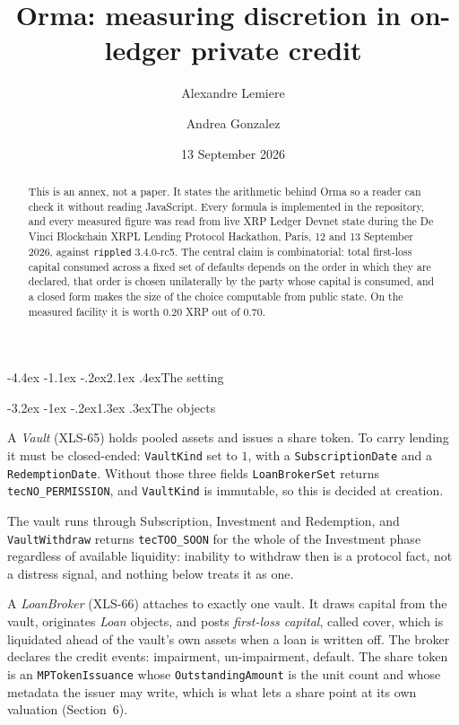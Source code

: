 \documentclass[11pt]{article}
\title{Orma: measuring discretion in on-ledger private credit}
\author{Alexandre Lemiere \and Andrea Gonzalez}
\date{13 September 2026}
\makeatletter
\renewcommand\section{\@startsection{section}{1}{\z@}%
  {-4.4ex \@plus -1.1ex \@minus -.2ex}{2.1ex \@plus .4ex}{\normalfont\Large\bfseries}}
\renewcommand\subsection{\@startsection{subsection}{2}{\z@}%
  {-3.2ex \@plus -1ex \@minus -.2ex}{1.3ex \@plus .3ex}{\normalfont\large\bfseries}}
\theoremstyle{orma}
\theoremstyle{ormaupright}
\makeatother
\begin{document}
\maketitle

\begin{abstract}
\noindent
This is an annex, not a paper. It states the arithmetic behind Orma so a reader can check it
without reading JavaScript. Every formula is implemented in the repository, and every
measured figure was read from live XRP Ledger Devnet state during the De Vinci Blockchain
XRPL Lending Protocol Hackathon, Paris, 12 and 13 September 2026, against \texttt{rippled}
3.4.0-rc5. The central claim is combinatorial: total first-loss capital consumed across a
fixed set of defaults depends on the order in which they are declared, that order is chosen
unilaterally by the party whose capital is consumed, and a closed form makes the size of the
choice computable from public state. On the measured facility it is worth $0.20$ XRP out of
$0.70$.
\end{abstract}

\section{The setting}

\subsection{The objects}

A \emph{Vault} (XLS-65) holds pooled assets and issues a share token. To carry lending it
must be closed-ended: \texttt{VaultKind} set to $1$, with a \texttt{SubscriptionDate} and a
\texttt{RedemptionDate}. Without those three fields \texttt{LoanBrokerSet} returns
\texttt{tecNO\_PERMISSION}, and \texttt{VaultKind} is immutable, so this is decided at
creation.

The vault runs through Subscription, Investment and Redemption, and
\texttt{VaultWithdraw} returns \texttt{tecTOO\_SOON} for the whole of the Investment phase
regardless of available liquidity: inability to withdraw then is a protocol fact, not a
distress signal, and nothing below treats it as one.

A \emph{LoanBroker} (XLS-66) attaches to exactly one vault. It draws capital from the vault,
originates \emph{Loan} objects, and posts \emph{first-loss capital}, called cover, which is
liquidated ahead of the vault's own assets when a loan is written off. The broker declares
the credit events: impairment, un-impairment, default. The share token is an
\texttt{MPTokenIssuance} whose \texttt{OutstandingAmount} is the unit count and whose
metadata the issuer may write, which is what lets a share point at its own valuation
(Section~6).
\end{document}
